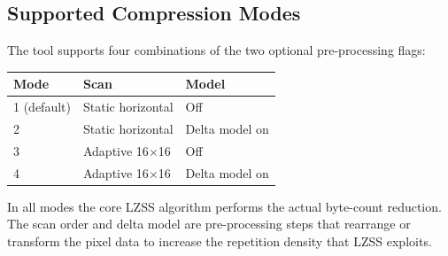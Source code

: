 \subsection{Supported Compression Modes}

The tool supports four combinations of the two optional pre-processing flags:

\begin{center}
\begin{tabular}{l l l}
\toprule
\textbf{Mode} & \textbf{Scan} & \textbf{Model} \\
\midrule
1 (default) & Static horizontal & Off \\
2           & Static horizontal & Delta model on \\
3           & Adaptive 16$\times$16 & Off \\
4           & Adaptive 16$\times$16 & Delta model on \\
\bottomrule
\end{tabular}
\end{center}

In all modes the core LZSS algorithm performs the actual byte-count reduction.
The scan order and delta model are pre-processing steps that rearrange or transform the
pixel data to increase the repetition density that LZSS exploits.
